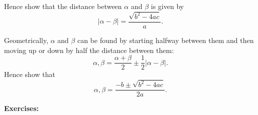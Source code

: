 \documentclass{article}
\begin{document}
\vfill

Hence show that the distance between $\alpha$ and $\beta$ is given by
\[|\alpha-\beta|=\frac{\sqrt{b^2-4ac}}{a}.\]

\vfill

Geometrically, $\alpha$ and $\beta$ can be found by starting halfway between them and then moving up or down by half the distance between them:
\[\alpha,\beta = \frac{\alpha+\beta}{2} \pm \frac{1}{2}|\alpha-\beta|.\]
Hence show that
\[\alpha,\beta = \frac{-b\pm\sqrt{b^2-4ac}}{2a}.\]





\clearpage


{\bf Exercises:}

\vspace{5mm}
\end{document}
